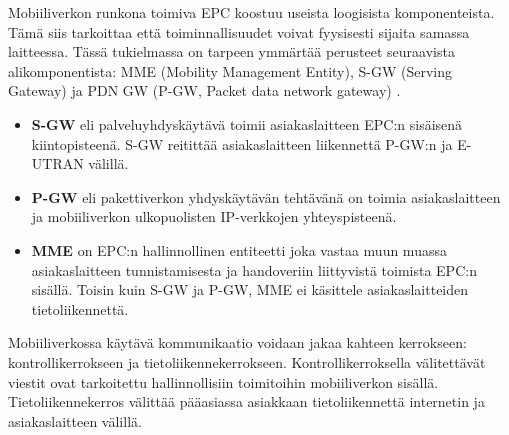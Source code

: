 Mobiiliverkon runkona toimiva EPC koostuu useista loogisista komponenteista.
Tämä siis tarkoittaa että toiminnallisuudet voivat fyysisesti sijaita samassa laitteessa. 
Tässä tukielmassa on tarpeen ymmärtää perusteet seuraavista alikomponentista: MME (Mobility Management Entity), S-GW (Serving Gateway) ja PDN GW (P-GW, Packet data network gateway) \cite{etsilte}.
\begin{itemize}
\item \textbf{S-GW} eli palveluyhdyskäytävä toimii asiakaslaitteen EPC:n sisäisenä kiintopisteenä.  S-GW reitittää asiakaslaitteen liikennettä P-GW:n ja E-UTRAN välillä.
\item \textbf{P-GW} eli pakettiverkon yhdyskäytävän tehtävänä on toimia asiakaslaitteen ja mobiiliverkon ulkopuolisten IP-verkkojen yhteyspisteenä.
\item \textbf{MME} on EPC:n hallinnollinen entiteetti joka vastaa muun muassa asiakaslaitteen tunnistamisesta ja handoveriin liittyvistä toimista EPC:n sisällä. Toisin kuin S-GW ja P-GW, MME ei käsittele asiakaslaitteiden tietoliikennettä.
\end{itemize}
\cite{3gppepc}

Mobiiliverkossa käytävä kommunikaatio voidaan jakaa kahteen kerrokseen: kontrollikerrokseen ja tietoliikennekerrokseen.
Kontrollikerroksella välitettävät viestit ovat tarkoitettu hallinnollisiin toimitoihin mobiiliverkon sisällä. 
Tietoliikennekerros välittää pääasiassa asiakkaan tietoliikennettä internetin ja asiakaslaitteen välillä.

